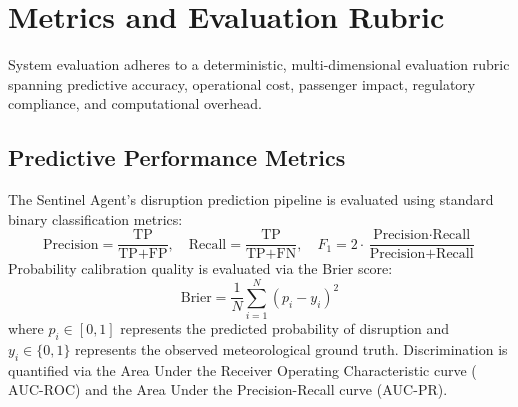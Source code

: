\section{Metrics and Evaluation Rubric}
\label{sec:metrics_rubric}

System evaluation adheres to a deterministic, multi-dimensional evaluation rubric spanning predictive accuracy, operational cost, passenger impact, regulatory compliance, and computational overhead.

\subsection{Predictive Performance Metrics}
The Sentinel Agent's disruption prediction pipeline is evaluated using standard binary classification metrics:
\begin{equation}
    \text{Precision} = \frac{\text{TP}}{\text{TP} + \text{FP}}, \quad \text{Recall} = \frac{\text{TP}}{\text{TP} + \text{FN}}, \quad F_1 = 2 \cdot \frac{\text{Precision} \cdot \text{Recall}}{\text{Precision} + \text{Recall}}
\end{equation}
Probability calibration quality is evaluated via the Brier score:
\begin{equation}
    \text{Brier} = \frac{1}{N} \sum_{i=1}^N (p_i - y_i)^2
\end{equation}
where $p_i \in [0, 1]$ represents the predicted probability of disruption and $y_i \in \{0, 1\}$ represents the observed meteorological ground truth. Discrimination is quantified via the Area Under the Receiver Operating Characteristic curve ($\text{AUC-ROC}$) and the Area Under the Precision-Recall curve ($\text{AUC-PR}$).

